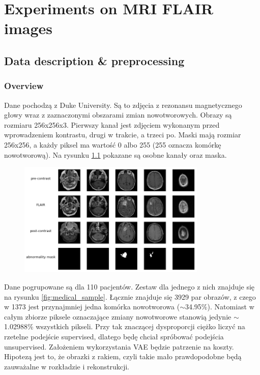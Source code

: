 \chapter{Experiments on MRI FLAIR images}

\section{Data description \& preprocessing}

\subsection{Overview}

Dane pochodzą z Duke University. Są to zdjęcia z rezonansu magnetycznego głowy wraz z zaznaczonymi obszarami zmian nowotworowych. Obrazy są rozmiaru 256x256x3. Pierwszy kanał jest zdjęciem wykonanym przed wprowadzeniem kontrastu, drugi w trakcie, a trzeci po. Maski mają rozmiar 256x256, a każdy piksel ma wartość 0 albo 255 (255 oznacza komórkę nowotworową). Na rysunku \ref{fig:medical_description} pokazane są osobne kanały oraz maska.

\begin{figure}[h!]
    \centering
    \includegraphics[width=0.8\textwidth]{images/medical_description}
    \caption{}
    \label{fig:medical_description}
\end{figure}

Dane pogrupowane są dla 110 pacjentów. Zestaw dla jednego z nich znajduje się na rysunku \ref{fig:medical_sample}. Łącznie znajduje się 3929 par obrazów, z czego w 1373 jest przynajmniej jedna komórka nowotworowa ($\sim$34.95\%). Natomiast w całym zbiorze piksele oznaczające zmiany nowotworowe stanowią jedynie $\sim$1.02988\% wszystkich pikseli. Przy tak znaczącej dysproporcji ciężko liczyć na rzetelne podejście supervised, dlatego będę chciał spróbować podejścia unsupervised. Założeniem wykorzystania VAE będzie patrzenie na koszty. Hipotezą jest to, że obrazki z rakiem, czyli takie mało prawdopodobne będą zauważalne w rozkładzie i rekonstrukcji.

